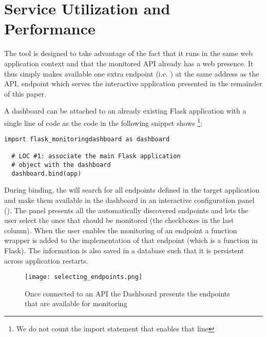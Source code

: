 

  \newpage
  \section{Service Utilization and Performance}


  The tool is designed to take advantage of the fact that it runs in the same web application context and that the monitored API already has a web presence. It thus simply makes available one extra endpoint (i.e. ) at the same address as the API, endpoint which serves the interactive application presented in the remainder of this paper. 

  A dashboard can be attached to an already existing Flask application with a single line of code as the code in the following snippet shows
  \footnote{We do not count the import statement that enables that line}:


  \begin{lstlisting}[style=custompython]
  import flask_monitoringdashboard as dashboard

  # LOC #1: associate the main Flask application 
  # object with the dashboard
  dashboard.bind(app) 

  \end{lstlisting}

  During binding, the \tool will search for all endpoints defined in the target application and make them available in the dashboard in an interactive configuration panel (). The panel presents all the automatically discovered endpoints and lets the user select the ones that should be monitored (the checkboxes in the last column). When the user enables the monitoring of an endpoint a function wrapper is added to the implementation of that endpoint (which is a function in Flask). The information is also saved in a database such that it is persistent across application restarts. 

  


    \begin{figure}[h!]
      \centering
      \texttt{[image: selecting\_endpoints.png]}
      \caption{Once connected to an API the Dashboard presents the endpoints that are available for monitoring}
      \label{fig:sep}
    \end{figure}

